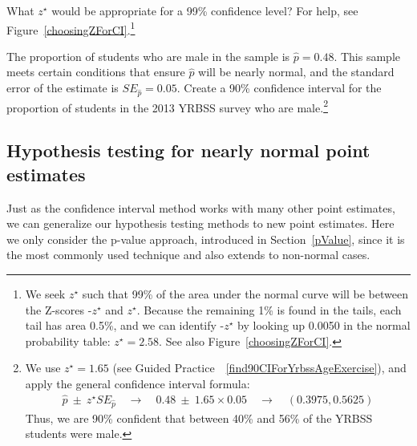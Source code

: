 \begin{exercise} \label{findZFor99PercConfLevelInFrameworkForInf}
What $z^{\star}$ would be appropriate for a 99\% confidence level? For help, see Figure~\vref{choosingZForCI}.\footnote{We seek $z^{\star}$ such that 99\% of the area under the normal curve will be between the Z-scores -$z^{\star}$ and $z^{\star}$. Because the remaining 1\% is found in the tails, each tail has area 0.5\%, and we can identify -$z^{\star}$ by looking up 0.0050 in the normal probability table: $z^{\star} = 2.58$. See also Figure~\vref{choosingZForCI}.}
\end{exercise}

\textC{\newpage}

\begin{exercise}
The proportion of students who are male in the  sample is $\hat{p} = 0.48$. This sample meets certain conditions that ensure $\hat{p}$ will be nearly normal, and the standard error of the estimate is $SE_{\hat{p}} = 0.05$. Create a 90\% confidence interval for the proportion of students in the 2013 YRBSS survey who are male.\footnote{We use $z^{\star}=1.65$ (see Guided Practice~~\vref{find90CIForYrbssAgeExercise}), and apply the general confidence interval formula:
\begin{eqnarray*}
\hat{p}\ \pm\ z^{\star}SE_{\hat{p}}
  \quad\to\quad 0.48\ \pm\ 1.65\times 0.05
  \quad\to\quad (0.3975, 0.5625)
\end{eqnarray*}
Thus, we are 90\% confident that between 40\% and 56\% of the YRBSS students were male.}
\end{exercise}


\subsection{Hypothesis testing for nearly normal point estimates}

Just as the confidence interval method works with many other point estimates, we can generalize our hypothesis testing methods to new point estimates. Here we only consider the p-value approach, introduced in Section~\ref{pValue}, since it is the most commonly used technique and also extends to non-normal cases.

